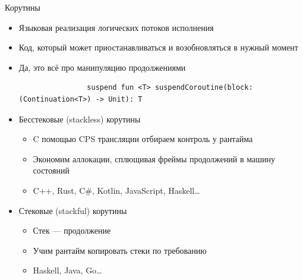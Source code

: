     \begin{frame}[fragile]{Корутины}
        \begin{itemize}
            \item Языковая реализация логических потоков исполнения
            \item Код, который может приостанавливаться и возобновляться в нужный момент
            \item Да, это всё про манипуляцию продолжениями
            \begin{verbatim}
                suspend fun <T> suspendCoroutine(block: (Continuation<T>) -> Unit): T
            \end{verbatim}
            \item Бесстековые (stackless) корутины
            \begin{itemize}
                \item C помощью CPS трансляции отбираем контроль у рантайма
                \item Экономим аллокации, сплющивая фреймы продолжений в машину состояний
                \item C++, Rust, C\#, Kotlin, JavaScript, Haskell\ldots
            \end{itemize}
            \item Стековые (stackful) корутины
            \begin{itemize}
                \item Стек --- продолжение
                \item Учим рантайм копировать стеки по требованию
                \item Haskell, Java, Go\ldots
            \end{itemize}
        \end{itemize}
    \end{frame}






